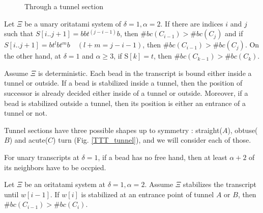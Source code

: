 \documentclass[runningheads]{llncs}
\begin{document}
\begin{figure}
\begin{center}
    \caption{Through a tunnel section}
    \label{TTT_tunnel_intro}
  \end{center}
\end{figure}




\begin{theorem}
Let $\Xi$ be a unary oritatami system of $\delta = 1, \alpha = 2$. If there are indices $i$ and $j$ such that $S[i..j+1] = bbt^{(j-i-1)}b$, then $\#bc(C_{i-1}) > \#bc(C_j)$ and if $S[i..j+1] = bt^lbt^mb \quad (l + m = j-i-1)$, then $\#bc(C_{i-1}) > \#bc(C_j)$. On the other hand, at $\delta = 1$ and $\alpha \geq 3$, if S$[k] = t$, then $\#bc(C_{k-1}) > \#bc(C_k)$.
\end{theorem}



\proof%
Assume $\Xi$ is deterministic.
Each bead in the transcript is bound either inside a tunnel or outside. If a bead is stabilized inside a tunnel, then the position of successor is already decided either inside of a tunnel or outside. Moreover, if a bead is stabilized outside a tunnel, then its position is either an entrance of a tunnel or not.

Tunnel sections have three possible shapes up to symmetry : straight($A$), obtuse($B$) and acute($C$) turn (Fig. \ref{TTT_tunnel}), and we will consider each of those. 

\begin{lemma}
\label{TTT_neighbor_lemma}
For unary transcripts at $\delta = 1$, if a bead has no free hand, then at least $\alpha + 2$ of its neighbors have to be occpied.
\end{lemma}

\begin{lemma}
\label{TTT_entrance_Tab}
Let $\Xi$ be an oritatami system at $\delta = 1, \alpha =2$. 
Assume $\Xi$ stabilizes the transcript until $w[i-1]$. If $w[i]$ is stabilized at an entrance point of tunnel $A$ or $B$, then $\#bc(C_{i-1}) > \#bc(C_{i})$.
\end{lemma}
\end{document}
